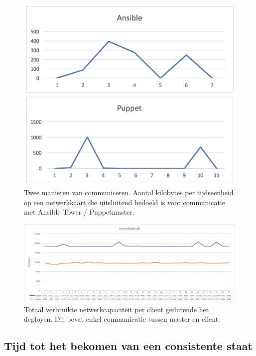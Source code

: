 \begin{figure}
	\includegraphics[width=430px]{img/deploytypes.png}
	\caption{Twee manieren van communiceren. Aantal kilobytes per tijdseenheid op een netwerkkaart die uitsluitend bedoeld is voor communicatie met Ansible Tower / Puppetmaster. }  
	\label{fig:deploytypes}
\end{figure}

\begin{figure}
	\includegraphics[width=\linewidth]{img/netwerkverbruik.png}
	\caption{Totaal verbruikte netwerkcapaciteit per client gedurende het deployen. Dit bevat enkel communicatie tussen master en client.}  
	\label{fig:netwerkverbruik}
\end{figure}



 
\subsection{Tijd tot het bekomen van een consistente staat}

